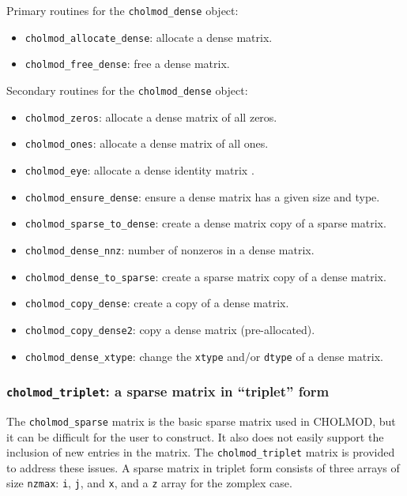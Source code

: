 \documentclass[11pt]{article}
\begin{document}
\vspace{0.1in}
\noindent Primary routines for the {\tt cholmod\_dense} object:
    \begin{itemize}
    \item {\tt cholmod\_allocate\_dense}: allocate a dense matrix.
    \item {\tt cholmod\_free\_dense}: free a dense matrix.
    \end{itemize}

\vspace{0.1in}
\noindent Secondary routines for the {\tt cholmod\_dense} object:
    \begin{itemize}
    \item {\tt cholmod\_zeros}: allocate a dense matrix of all zeros.
    \item {\tt cholmod\_ones}: allocate a dense matrix of all ones.
    \item {\tt cholmod\_eye}: allocate a dense identity matrix .
    \item {\tt cholmod\_ensure\_dense}: ensure a dense matrix has a given
        size and type.
    \item {\tt cholmod\_sparse\_to\_dense}: create a dense matrix copy of a
        sparse matrix.
    \item {\tt cholmod\_dense\_nnz}: number of nonzeros in a dense matrix.
    \item {\tt cholmod\_dense\_to\_sparse}: create a sparse matrix copy of a
        dense matrix.
    \item {\tt cholmod\_copy\_dense}: create a copy of a dense matrix.
    \item {\tt cholmod\_copy\_dense2}: copy a dense matrix (pre-allocated).
    \item {\tt cholmod\_dense\_xtype}: change the {\tt xtype}
        and/or {\tt dtype} of a dense matrix.
    \end{itemize}

\subsubsection{{\tt cholmod\_triplet}: a sparse matrix in ``triplet'' form}

The {\tt cholmod\_sparse} matrix is the basic sparse matrix used in CHOLMOD,
but it can be difficult for the user to construct.  It also does not easily
support the inclusion of new entries in the matrix.  The {\tt cholmod\_triplet}
matrix is provided to address these issues.  A sparse matrix in triplet form
consists of three arrays of size {\tt nzmax}: {\tt i}, {\tt j}, and {\tt x},
and a {\tt z} array for the zomplex case.
\end{document}
